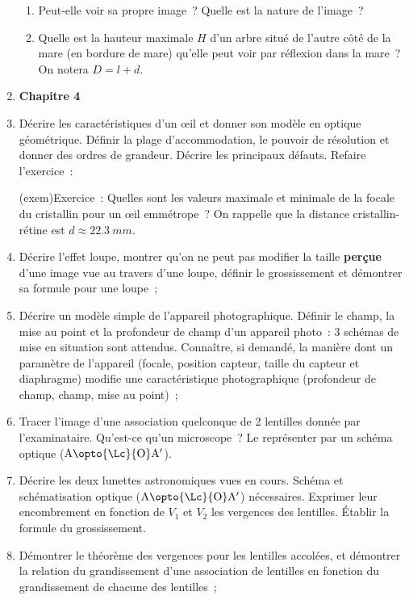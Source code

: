 \documentclass[a4paper, 12pt, final, garamond]{book}
\begin{document}
\begin{enumerate}
\begin{tcb}
		      \begin{enumerate}
			      \item Peut-elle voir sa propre image~? Quelle est la nature de
			            l'image~?
			      \item Quelle est la hauteur maximale $H$ d'un arbre situé de l'autre
			            côté de la mare (en bordure de mare) qu'elle peut voir par
			            réflexion dans la mare~? On notera $D = l+d$.
		      \end{enumerate}
	      \end{tcb}
	\item[] \textbf{Chapitre 4}
	\item Décrire les caractéristiques d'un œil et donner son modèle en optique
	      géométrique. Définir la plage d'accommodation, le pouvoir de résolution
	      et donner des ordres de grandeur. Décrire les principaux défauts.
	      Refaire l'exercice~:
	      \begin{tcb}(exem){Exercice~:}
		      Quelles sont les valeurs maximale et minimale de la focale du cristallin pour
		      un œil emmétrope~? On rappelle que la distance cristallin-rétine est $d
			      \approx \SI{22.3}{mm}$.
	      \end{tcb}
	\item Décrire l'effet loupe, montrer qu'on ne peut pas modifier la taille
	      \textbf{perçue} d'une image vue au travers d'une loupe, définir le
	      grossissement et démontrer sa formule pour une loupe~;
	\item Décrire un modèle simple de l'appareil photographique. Définir le
	      champ, la mise au point et la profondeur de champ d'un appareil photo~:
	      3 schémas de mise en situation sont attendus. Connaître, si demandé, la
	      manière dont un paramètre de l'appareil (focale, position capteur,
	      taille du capteur et diaphragme) modifie une caractéristique
	      photographique (profondeur de champ, champ, mise au point)~;
	\item Tracer l'image d'une association quelconque de 2 lentilles donnée par
	      l'examinataire. Qu'est-ce qu'un microscope~? Le représenter par un schéma
	      optique ($\rm A \opto{\Lc}{\rm O} A'$).
	\item Décrire les deux lunettes astronomiques vues en cours. Schéma et
	      schématisation optique ($\rm A \opto{\Lc}{\rm O} A'$) nécessaires.
	      Exprimer leur encombrement en fonction de $V_1$ et $V_2$ les vergences
	      des lentilles. Établir la formule du grossissement.
	\item Démontrer le théorème des vergences pour les lentilles accolées, et
	      démontrer la relation du grandissement d'une association de lentilles en
	      fonction du grandissement de chacune des lentilles~;
\end{enumerate}
\end{document}
